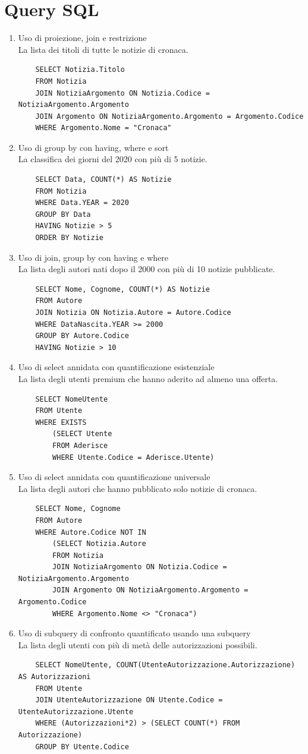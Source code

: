 \documentclass[10pt]{article}
\begin{document}
\section{Query SQL}
\begin{enumerate}
	\item Uso di proiezione, join e restrizione\\
	La lista dei titoli di tutte le notizie di cronaca.
	\begin{lstlisting}
	SELECT Notizia.Titolo
	FROM Notizia
	JOIN NotiziaArgomento ON Notizia.Codice = NotiziaArgomento.Argomento
	JOIN Argomento ON NotiziaArgomento.Argomento = Argomento.Codice
	WHERE Argomento.Nome = "Cronaca"
	\end{lstlisting}
	\item Uso di group by con having, where e sort\\
	La classifica dei giorni del 2020 con più di 5 notizie.
	\begin{lstlisting}
	SELECT Data, COUNT(*) AS Notizie
	FROM Notizia
	WHERE Data.YEAR = 2020
	GROUP BY Data
	HAVING Notizie > 5
	ORDER BY Notizie
	\end{lstlisting}
	\item Uso di join, group by con having e where\\
	La lista degli autori nati dopo il 2000 con più di 10 notizie pubblicate.
	\begin{lstlisting}
	SELECT Nome, Cognome, COUNT(*) AS Notizie
	FROM Autore
	JOIN Notizia ON Notizia.Autore = Autore.Codice
	WHERE DataNascita.YEAR >= 2000
	GROUP BY Autore.Codice
	HAVING Notizie > 10
	\end{lstlisting}
	\item Uso di select annidata con quantificazione esistenziale\\
	La lista degli utenti premium che hanno aderito ad almeno una offerta.
	\begin{lstlisting}
	SELECT NomeUtente
	FROM Utente
	WHERE EXISTS
		(SELECT Utente
		FROM Aderisce
		WHERE Utente.Codice = Aderisce.Utente)
	\end{lstlisting}
	\item Uso di select annidata con quantificazione universale\\
	La lista degli autori che hanno pubblicato solo notizie di cronaca.
	\begin{lstlisting}
	SELECT Nome, Cognome
	FROM Autore
	WHERE Autore.Codice NOT IN
		(SELECT Notizia.Autore
		FROM Notizia
		JOIN NotiziaArgomento ON Notizia.Codice = NotiziaArgomento.Argomento
		JOIN Argomento ON NotiziaArgomento.Argomento = Argomento.Codice
		WHERE Argomento.Nome <> "Cronaca")
	\end{lstlisting}
	\item Uso di subquery di confronto quantificato usando una subquery\\
	La lista degli utenti con più di metà delle autorizzazioni possibili.
	\begin{lstlisting}
	SELECT NomeUtente, COUNT(UtenteAutorizzazione.Autorizzazione) AS Autorizzazioni
	FROM Utente
	JOIN UtenteAutorizzazione ON Utente.Codice = UtenteAutorizzazione.Utente
	WHERE (Autorizzazioni*2) > (SELECT COUNT(*) FROM Autorizzazione)
	GROUP BY Utente.Codice
	\end{lstlisting}
\end{enumerate}
\end{document}
